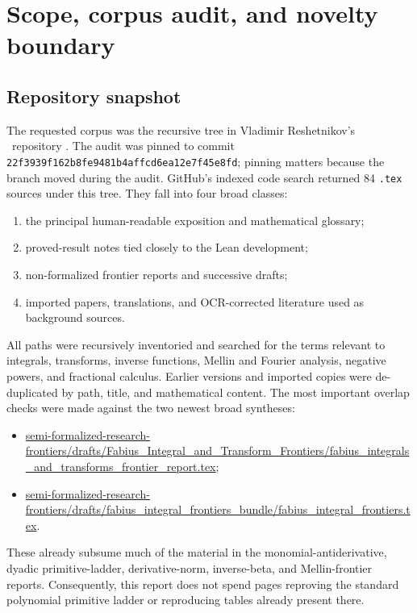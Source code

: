 \documentclass[11pt,oneside]{article}
\theoremstyle{definition}
\theoremstyle{remark}
\newcommand{\1}{\mathbf 1}
\begin{document}
\newpage

\section{Scope, corpus audit, and novelty boundary}
\label{p11:sec:scope}

\subsection{Repository snapshot}

The requested corpus was the recursive tree
 in Vladimir Reshetnikov's
\repoPartvvv\ repository \cite{p11:ProveIt}.  The audit was pinned to commit
\texttt{22f3939f162b8fe9481b4\allowbreak affcd6ea12e7f45e8fd}; pinning matters because the
branch moved during the audit.  GitHub's indexed code search returned 84
\texttt{.tex} sources under this tree.  They fall into four broad classes:

\begin{enumerate}
\item the principal human-readable exposition and mathematical glossary;
\item proved-result notes tied closely to the Lean development;
\item non-formalized frontier reports and successive drafts;
\item imported papers, translations, and OCR-corrected literature used as
      background sources.
\end{enumerate}

All paths were recursively inventoried and searched for the terms relevant to
integrals, transforms, inverse functions, Mellin and Fourier analysis,
negative powers, and fractional calculus.  Earlier versions and imported
copies were de-duplicated by path, title, and mathematical content.  The most
important overlap checks were made against the two newest broad syntheses:

\begin{itemize}
\item \url{semi-formalized-research-frontiers/drafts/Fabius_Integral_and_Transform_Frontiers/fabius_integrals_and_transforms_frontier_report.tex};
\item \url{semi-formalized-research-frontiers/drafts/fabius_integral_frontiers_bundle/fabius_integral_frontiers.tex}.
\end{itemize}

These already subsume much of the material in the monomial-antiderivative,
dyadic primitive-ladder, derivative-norm, inverse-beta, and Mellin-frontier
reports.  Consequently, this report does not spend pages reproving the
standard polynomial primitive ladder or reproducing tables already present
there.
\end{document}
